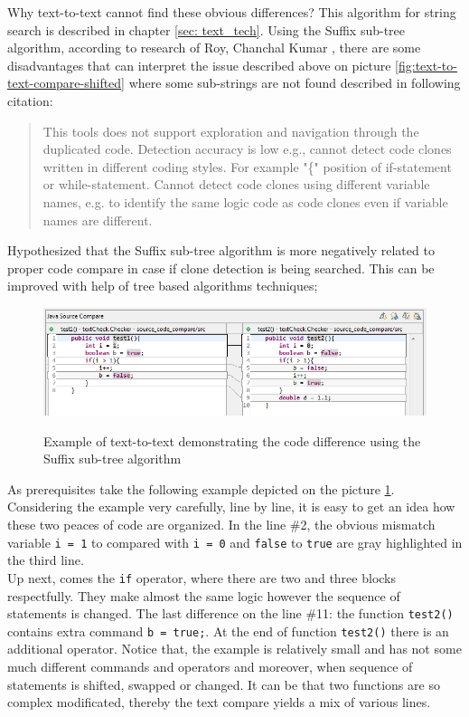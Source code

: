 \documentclass{report}
\begin{document}
Why text-to-text cannot find these obvious differences? This algorithm for string search is described in chapter \ref{sec: text_tech}. Using the Suffix sub-tree algorithm,  according to research of Roy, Chanchal Kumar \cite{software_clone_detection}, there are some disadvantages that can interpret the issue described above on picture \ref{fig:text-to-text-compare-shifted} where some sub-strings are not found described in following citation:
\begin{quote} 
This tools does not support exploration and navigation through the duplicated code. Detection accuracy is low e.g., cannot detect code clones written in different coding styles. For example "\{" position of if-statement or while-statement. Cannot detect code clones using different variable names, e.g. to identify the same logic code as code clones even if variable names are different\cite{software_clone_detection}. 
\end{quote}

Hypothesized that the Suffix sub-tree algorithm is more negatively related to proper code compare in case if clone detection is being searched. This can be improved with help of tree based algorithms techniques;
\begin{figure}[h]
  \centering
  \includegraphics[width=1.00\textwidth]{Figures/text-to-text/text-compared-for-improve}\\[0.1cm]
  \caption[Text comparison example where strings of code are replaced.]{Example of text-to-text demonstrating the code difference using the Suffix sub-tree algorithm }
  \label{fig:text-compared-for-improve}
\end{figure}

As prerequisites take the following example depicted on the picture \ref{fig:text-compared-for-improve}. Considering the example very carefully, line by line, it is easy to get an idea how these two peaces of code are organized. In the line \#2, the obvious mismatch variable \texttt{i = 1} to compared with \texttt{i = 0} and \texttt{false} to \texttt{true} are gray highlighted in the third line.
\\
Up next, comes the \texttt{if} operator, where there are two and three blocks respectfully. They make almost the same logic however the sequence of statements is changed.
The last difference on the line \#11: the function \texttt{test2()} contains extra command \texttt{b = true;}.
At the end of function \texttt{test2()} there is an additional operator. Notice that, the example is relatively small and has not some much different commands and operators and moreover, when sequence of statements is shifted, swapped or changed. It can be that two functions are so complex modificated, thereby the text compare yields a mix of various lines. 
\end{document}
